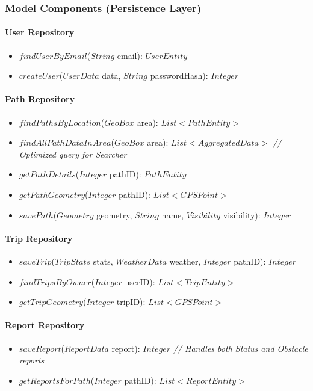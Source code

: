 \subsubsection*{Model Components (Persistence Layer)}

\paragraph*{User Repository}
\begin{itemize}
    \item $findUserByEmail$($String$ email): $UserEntity$
    \item $createUser$($UserData$ data, $String$ passwordHash): $Integer$
\end{itemize}

\paragraph*{Path Repository}
\begin{itemize}
    \item $findPathsByLocation$($GeoBox$ area): $List<PathEntity>$
    \item $findAllPathDataInArea$($GeoBox$ area): $List<AggregatedData>$ \textit{// Optimized query for Searcher}
    \item $getPathDetails$($Integer$ pathID): $PathEntity$
    \item $getPathGeometry$($Integer$ pathID): $List<GPSPoint>$
    \item $savePath$($Geometry$ geometry, $String$ name, $Visibility$ visibility): $Integer$
\end{itemize}

\paragraph*{Trip Repository}
\begin{itemize}
    \item $saveTrip$($TripStats$ stats, $WeatherData$ weather, $Integer$ pathID): $Integer$
    \item $findTripsByOwner$($Integer$ userID): $List<TripEntity>$
    \item $getTripGeometry$($Integer$ tripID): $List<GPSPoint>$
\end{itemize}

\paragraph*{Report Repository}
\begin{itemize}
    \item $saveReport$($ReportData$ report): $Integer$ \textit{// Handles both Status and Obstacle reports}
    \item $getReportsForPath$($Integer$ pathID): $List<ReportEntity>$
\end{itemize}

